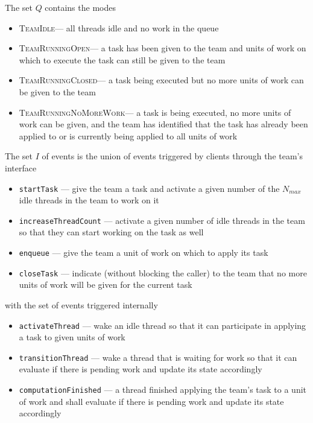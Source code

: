 \documentclass{article}
\newcommand{\TeamIdle}          {\textsc{TeamIdle}}
\newcommand{\TeamRunningOpen}   {\textsc{TeamRunningOpen}}
\newcommand{\TeamRunningClosed} {\textsc{TeamRunningClosed}}
\newcommand{\TeamRunningNoMoreWork} {\textsc{TeamRunningNoMoreWork}}
\newcommand{\TeamTerminating}   {\textsc{TeamTerminating}}
\begin{document}
The set $Q$ contains the modes
\begin{itemize}
\item{\TeamIdle --- all threads idle and no work in the queue}
\item{\TeamRunningOpen --- a task has been given to the team and units of work
on which to execute the task can still be given to the team}
\item{\TeamRunningClosed --- a task being executed but no more units
of work can be given to the team}
\item{\TeamRunningNoMoreWork --- a task is being executed, no more
units of work can be given, and the team has identified that the task has
already been applied to or is currently being applied to all units of work}
\end{itemize}

The set $I$ of events is the union of events triggered by clients through the
team's interface
\begin{itemize}
\item{\texttt{startTask} --- give the team a task and activate a given number of the
$N_{max}$ idle threads in the team to work on it}
\item{\texttt{increaseThreadCount} --- activate a given number of idle threads in the
team so that they can start working on the task as well}
\item{\texttt{enqueue} --- give the team a unit of work on which to apply its
task}
\item{\texttt{closeTask} --- indicate (without blocking the caller) to the team
that no more units of work will be given for the current task}
\end{itemize}
with the set of events triggered internally
\begin{itemize}
\item{\texttt{activateThread} --- wake an idle thread so that it can participate
in applying a task to given units of work}
\item{\texttt{transitionThread} --- wake a thread that is waiting for work so
that it can evaluate if there is pending work and update its state accordingly}
\item{\texttt{computationFinished} --- a thread finished applying the team's
task to a unit of work and shall evaluate if there is pending work and update
its state accordingly}
\end{itemize}
\end{document}
